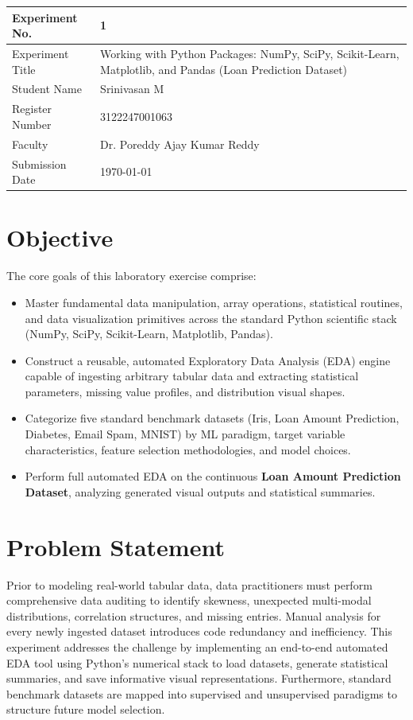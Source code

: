 \documentclass[12pt,a4paper]{article}
\begin{document}
\begin{tabular}{|p{4cm}|p{11cm}|}
\hline
Experiment No. & 1 \\ \hline
Experiment Title & Working with Python Packages: NumPy, SciPy, Scikit-Learn, Matplotlib, and Pandas (Loan Prediction Dataset) \\ \hline
Student Name & Srinivasan M \\ \hline
Register Number & 3122247001063 \\ \hline
Faculty & Dr. Poreddy Ajay Kumar Reddy \\ \hline
Submission Date & \today \\ \hline
\end{tabular}

\vspace{0.3cm}

\section{Objective}
The core goals of this laboratory exercise comprise:
\begin{itemize}[noitemsep]
    \item Master fundamental data manipulation, array operations, statistical routines, and data visualization primitives across the standard Python scientific stack (NumPy, SciPy, Scikit-Learn, Matplotlib, Pandas).
    \item Construct a reusable, automated Exploratory Data Analysis (EDA) engine capable of ingesting arbitrary tabular data and extracting statistical parameters, missing value profiles, and distribution visual shapes.
    \item Categorize five standard benchmark datasets (Iris, Loan Amount Prediction, Diabetes, Email Spam, MNIST) by ML paradigm, target variable characteristics, feature selection methodologies, and model choices.
    \item Perform full automated EDA on the continuous \textbf{Loan Amount Prediction Dataset}, analyzing generated visual outputs and statistical summaries.
\end{itemize}

\section{Problem Statement}
Prior to modeling real-world tabular data, data practitioners must perform comprehensive data auditing to identify skewness, unexpected multi-modal distributions, correlation structures, and missing entries. Manual analysis for every newly ingested dataset introduces code redundancy and inefficiency. This experiment addresses the challenge by implementing an end-to-end automated EDA tool using Python's numerical stack to load datasets, generate statistical summaries, and save informative visual representations. Furthermore, standard benchmark datasets are mapped into supervised and unsupervised paradigms to structure future model selection.
\end{document}
